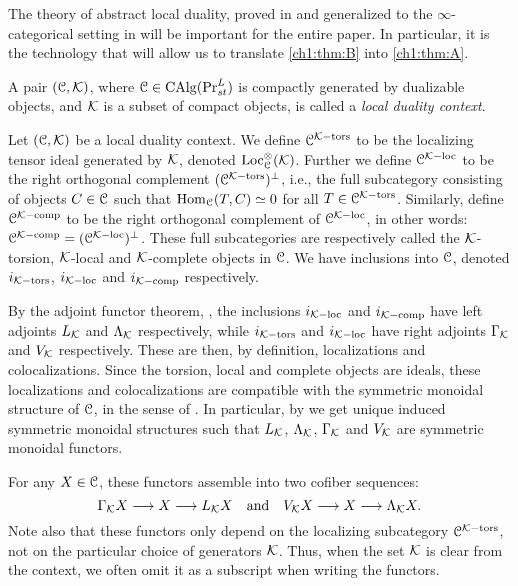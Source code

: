 The theory of abstract local duality, proved in \cite{hovey-palmiery-strickland_97} and generalized to the $\infty$-categorical setting in \cite{barthel-heard-valenzuela_2018} will be important for the entire paper. In particular, it is the technology that will allow us to translate \cref{ch1:thm:B} into \cref{ch1:thm:A}. 

\begin{definition}
    \label{ch1:def:local-duality-context}
    A pair $(\EuScript{C}, \mathcal{K})$, where $\EuScript{C}\in \operatorname{CAlg}(\mathrm{Pr}_{st}^L)$ is compactly generated by dualizable objects, and $\mathcal{K}$ is a subset of compact objects, is called a \emph{local duality context}.
\end{definition}

\begin{construction}
    Let $(\EuScript{C}, \mathcal{K})$ be a local duality context. We define $\EuScript{C}^{\mathcal{K}-\mathrm{tors}}$ to be the localizing tensor ideal generated by $\mathcal{K}$, denoted $\operatorname{Loc}^\otimes_{\EuScript{C}}(\mathcal{K})$. Further we define $\EuScript{C}^{\mathcal{K}-\mathrm{loc}}$ to be the right orthogonal complement $(\EuScript{C}^{\mathcal{K}-\mathrm{tors}})^\perp$, i.e., the full subcategory consisting of objects $C\in \EuScript{C}$ such that $\operatorname{Hom}_{\EuScript{C}}(T,C)\simeq 0$ for all $T\in \EuScript{C}^{\mathcal{K}-\mathrm{tors}}$. Similarly, define $\EuScript{C}^{\mathcal{K}-\mathrm{comp}}$ to be the right orthogonal complement of $\EuScript{C}^{\mathcal{K}-\mathrm{loc}}$, in other words: $\EuScript{C}^{\mathcal{K}-\mathrm{comp}}= (\EuScript{C}^{\mathcal{K}-\mathrm{loc}})^\perp$. These full subcategories are respectively called the $\mathcal{K}$-torsion, $\mathcal{K}$-local and $\mathcal{K}$-complete objects in $\EuScript{C}$. We have inclusions into $\EuScript{C}$, denoted $i_{\mathcal{K}-\mathrm{tors}}$, $i_{\mathcal{K}-\mathrm{loc}}$ and $i_{\mathcal{K}-\mathrm{comp}}$ respectively. 
    
    By the adjoint functor theorem, \cite[5.5.2.9]{lurie_09}, the inclusions $i_{\mathcal{K}-\mathrm{loc}}$ and $i_{\mathcal{K}-\mathrm{comp}}$ have left adjoints $L_{\mathcal{K}}$ and $\Lambda_{\mathcal{K}}$ respectively, while $i_{\mathcal{K}-\mathrm{tors}}$ and $i_{\mathcal{K}-\mathrm{loc}}$ have right adjoints $\Gamma_{\mathcal{K}}$ and $V_{\mathcal{K}}$ respectively. These are then, by definition, localizations and colocalizations. Since the torsion, local and complete objects are ideals, these localizations and colocalizations are compatible with the symmetric monoidal structure of $\EuScript{C}$, in the sense of \cite[2.2.1.7]{Lurie_HA}. In particular, by \cite[2.2.1.9]{Lurie_HA} we get unique induced symmetric monoidal structures such that $L_{\mathcal{K}}$, $\Lambda_{\mathcal{K}}$, $\Gamma_{\mathcal{K}}$ and $V_{\mathcal{K}}$ are symmetric monoidal functors. 

    For any $X\in \EuScript{C}$, these functors assemble into two cofiber sequences:
    \[\Gamma_{\mathcal{K}} X \longrightarrow X \longrightarrow L_{\mathcal{K}} X \quad \text{and}\quad V_{\mathcal{K}} X \longrightarrow X \longrightarrow \Lambda_{\mathcal{K}} X.\]
    Note also that these functors only depend on the localizing subcategory $\EuScript{C}^{\mathcal{K}-\mathrm{tors}}$, not on the particular choice of generators $\mathcal{K}$. Thus, when the set $\mathcal{K}$ is clear from the context, we often omit it as a subscript when writing the functors. 
\end{construction}


